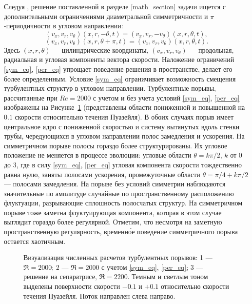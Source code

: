 Следуя \cite{Avila2013}, решение поставленной в разделе \ref{math_section} задачи ищется с дополнительными ограничениями диаметральной симметричности и $\pi$-периодичности в угловом направлении:
\begin{equation}\label{sym_eq}
(v_x, v_r, v_\theta)(x, r, -\theta, t) = (v_x, v_r, -v_\theta)(x, r, \theta, t),
\end{equation}
\begin{equation}\label{per_eq}
(v_x, v_r, v_\theta)(x, r, \theta+\pi, t) = (v_x, v_r, v_\theta)(x, r, \theta, t).
\end{equation}
Здесь $(x, r, \theta)$ --- цилиндрические координаты, $(v_x, v_r, v_\theta)$ --- продольная, радиальная и угловая компоненты вектора скорости. Наложение ограничений \eqref{sym_eq}, \eqref{per_eq} упрощает поведение решения в пространстве, делает его более определенным. Условие \eqref{sym_eq} ограничивает возможность смещения турбулентных структур в угловом направлении.  Турбулентные порывы, рассчитанные при $Re=2000$ с учетом и без учета условий \eqref{sym_eq}, \eqref{per_eq} изображены на Рисунке~\ref{3D_img} (представлены области пониженной и повышенной на $0.1$ скорости относительно течения Пуазейля). В обоих случаях порыв имеет центральное ядро с пониженной скоростью и систему вытянутых вдоль стенки трубы, чередующихся в угловом направлении полос замедления и ускорения. На симметричном порыве полосы гораздо более структурированы. Их угловое положение не меняется в процессе эволюции: угловые области $\theta=k\pi/2$, $k$ от $0$ до $3$, где в силу \eqref{sym_eq}, \eqref{per_eq} угловая компонента скорости тождественно равна нулю, заняты полосами ускорения, промежуточные области $\theta=\pi/4+k\pi/2$ --- полосами замедления. На порыве без условий симметрии наблюдаются значительные по амплитуде случайные по пространственному расположению флуктуации, разрывающие сплошность полосчатых структур. На симметричном порыве тоже заметна флуктуирующая компонента, которая в этом случае выглядит гораздо более регулярной. Отметим, что несмотря на заметную пространственную регулярность, временн\'{о}е поведение симметричного порыва остается хаотичным.


\begin{figure}[h]
\caption{Визуализация численных расчетов турбулентных порывов: 1 --- $\Re = 2000$; 2 --- $\Re = 2000$ с учетом \eqref{sym_eq}, \eqref{per_eq}; 3 --- решение на сепаратрисе, $\Re = 2200$. Темным и светлым тоном выделены поверхности скорости $-0.1$ и $+0.1$ относительно скорости течения Пуазейля. Поток направлен слева направо.}
\label{3D_img}
\end{figure}

